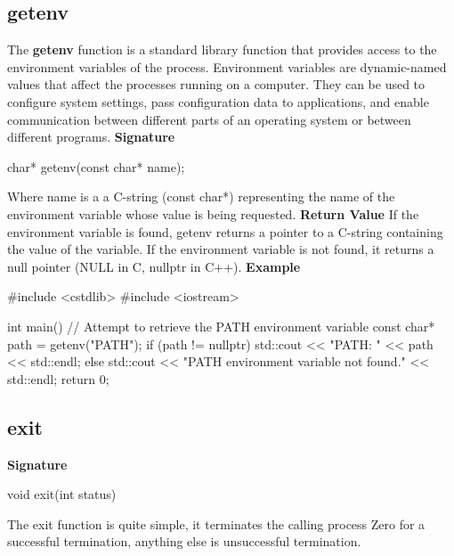 \documentclass{report}
\begin{document}
    \subsection{getenv}
    \bigbreak \noindent 
    \begin{concept}
        The \textbf{getenv} function is a standard library function that provides access to the environment variables of the process. Environment variables are dynamic-named values that affect the processes running on a computer. They can be used to configure system settings, pass configuration data to applications, and enable communication between different parts of an operating system or between different programs.
        \bigbreak \noindent 
        \textbf{Signature}
        \begin{cppcode}
            char* getenv(const char* name);
        \end{cppcode}
        \bigbreak \noindent 
        Where name is a a C-string (const char*) representing the name of the environment variable whose value is being requested.
        \bigbreak \noindent 
        \textbf{Return Value}
        \bigbreak \noindent 
        If the environment variable is found, getenv returns a pointer to a C-string containing the value of the variable.
        \bigbreak \noindent 
        If the environment variable is not found, it returns a null pointer (NULL in C, nullptr in C++).
        \bigbreak \noindent 
        \textbf{Example} 
        \bigbreak \noindent 
        \begin{cppcode}
            #include <cstdlib>
            #include <iostream>

            int main() {
                // Attempt to retrieve the PATH environment variable
                const char* path = getenv("PATH");
                if (path != nullptr) {
                    std::cout << "PATH: " << path << std::endl;
                } else {
                    std::cout << "PATH environment variable not found." << std::endl;
                }
                return 0;
            }
        \end{cppcode}
    \end{concept}

    \pagebreak 
    \subsection{exit}
    \bigbreak \noindent 
    \textbf{Signature}
    \bigbreak \noindent 
    \begin{cppcode}
    void exit(int status)
    \end{cppcode}
    \bigbreak \noindent 
    The exit function is quite simple, it terminates the calling process
    \bigbreak \noindent 
    Zero for a successful termination, anything else is unsuccessful termination.
    \bigbreak \noindent 
\end{document}
